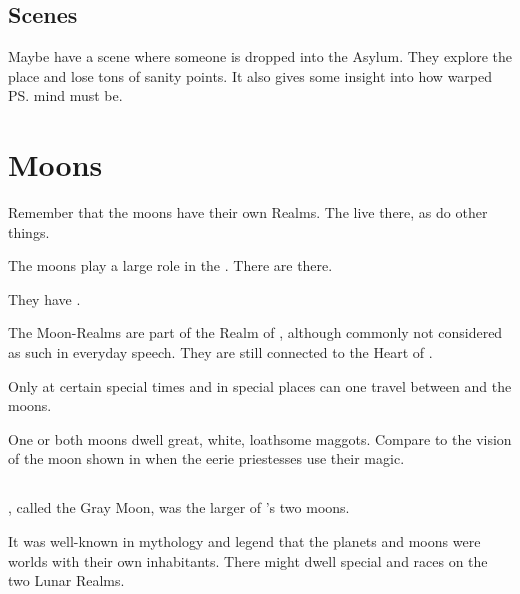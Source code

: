 \subsection{Scenes}
Maybe have a scene where someone is dropped into the Asylum. 
They explore the place and lose tons of sanity points. 
It also gives some insight into how warped \ps{\Ishnaruchaefir} mind must be. 

















\section{Moons}
Remember that the moons have their own Realms. 
The \moonwolves{} live there, as do other things. 

The moons play a large role in the \feud. There are \nexi{} there.

They have . 

The Moon-Realms are  part of the Realm of \Miith{}, although commonly not considered as such in everyday speech. 
They are still connected to the Heart of \Miith{}. 

Only at certain special times and in special places can one travel between \Azmith{} and the moons. 

One or both moons dwell great, white, loathsome maggots. 
Compare to the vision of the moon shown in \cite{KarlEdwardWagner:Bloodstone} when the eerie priestesses use their magic. 







\subsection[Dun]{\Dun} 
\index{\Dun}
\Dun, called the Gray Moon, was the larger of \Miith{}'s two moons. 

It was well-known in mythology and legend that the planets and moons were worlds with their own inhabitants. 
There might dwell special \demihuman and \demiscatha races on the two Lunar Realms.

